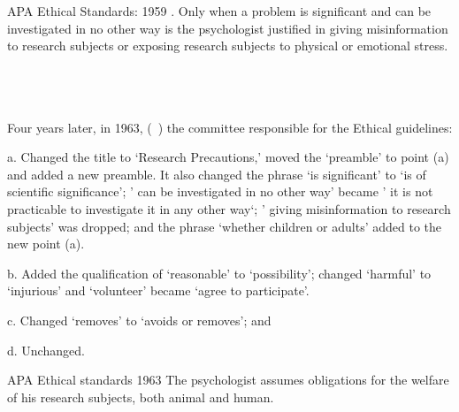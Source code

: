 \begin{refsection}
\begin{apatextbox}{APA Ethical Standards: 1959}\label{sample:APAEthics1959}
. Only when a problem is significant and can be investigated in no other way is the psychologist justified in giving misinformation to research subjects or exposing research subjects to physical or emotional stress.\\

\\

\\

\\
\end{apatextbox}

Four years later, in 1963, (~\citep{Association:1963uu}) the committee responsible for the Ethical guidelines:

a. Changed the title to `Research Precautions,' moved the `preamble' to point (a) and added a new preamble. It also changed the phrase `is significant' to `is of scientific significance'; ' can be investigated in no other way' became ' it is not practicable to investigate it in any other way`; ' giving misinformation to research subjects' was dropped; and the phrase `whether children or adults' added to the new point (a).

b. Added the qualification of `reasonable' to `possibility'; changed `harmful' to `injurious' and `volunteer' became `agree to participate'. 

c. Changed `removes' to `avoids or removes'; and 

d. Unchanged.

\begin{apatextbox}{APA Ethical standards 1963}
\label{sample: APAEthics1963}
 The psychologist assumes obligations for the welfare of his research subjects, both animal and human.\\


\end{apatextbox}
\end{refsection}
